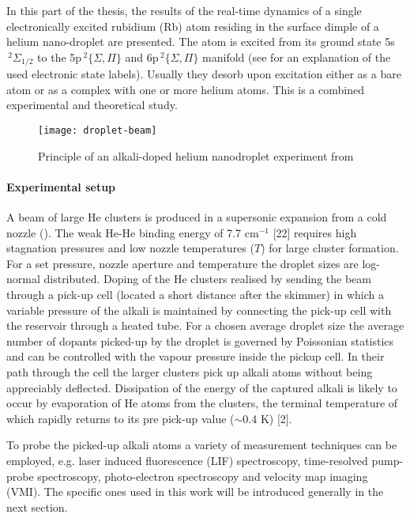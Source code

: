 	In this part of the thesis, the results of the real-time dynamics of a single electronically excited rubidium (Rb) atom residing in the surface dimple of a helium nano-droplet are presented. The atom is excited from its ground state 5s$\,^2\Sigma_{1/2}$ to the 5p$\,^2\{\Sigma,\Pi\}$ and 6p$\,^2\{\Sigma,\Pi\}$ manifold (see  for an explanation of the used electronic state labels). Usually they desorb upon excitation either as a bare atom or as a complex with one or more helium atoms. This is a combined experimental and theoretical study.
	
	\begin{figure}[t]
		\begin{center}
			\texttt{[image: droplet-beam]}
			\caption{Principle of an alkali-doped helium nanodroplet experiment from}
			\label{fig:droplet-beam}
		\end{center}
	\end{figure}
	
	\paragraph{Experimental setup}A beam of large He clusters is produced in a supersonic expansion from a cold nozzle (). The weak He-He binding energy of 7.7 cm$^{-1}$ [22] requires high stagnation pressures and low nozzle temperatures ($T$) for large cluster formation. For a set pressure, nozzle aperture and temperature the droplet sizes are log-normal distributed. Doping of the He clusters realised by sending the beam through a pick-up cell (located a short distance after the skimmer) in which a variable pressure of the alkali is maintained by connecting the pick-up cell with the reservoir through a heated tube. For a chosen average droplet size the average number of dopants picked-up by the droplet is governed by Poissonian statistics and can be controlled with the vapour pressure inside the pickup cell. In their path through the cell the larger clusters pick up alkali atoms without being appreciably deflected. Dissipation of the energy of the captured alkali is likely to occur by evaporation of He atoms from the clusters, the terminal temperature of which rapidly returns to its pre pick-up value ($\sim$0.4 K) [2].

	To probe the picked-up alkali atoms a variety of measurement techniques can be employed, e.g. laser induced fluorescence (LIF) spectroscopy, time-resolved pump-probe spectroscopy, photo-electron spectroscopy and velocity map imaging (VMI). The specific ones used in this work will be introduced generally in the next section.%
